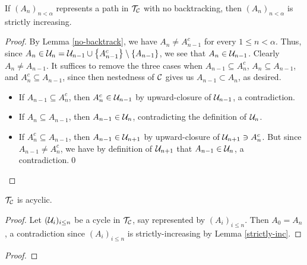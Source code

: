 \documentclass{amsart}
\begin{document}
    \begin{lemma}\label{strictly-inc}
        If $(A_n)_{n<\alpha}$ represents a path in $\mathcal{T}_{\mathcal{C}}$ with no backtracking, then $(A_n)_{n<\alpha}$ is strictly increasing.
    \end{lemma}
    \begin{proof}
        By Lemma \ref{no-backtrack}, we have $A_n\neq A_{n-1}^c$ for every $1\leq n<\alpha$. Thus, since $A_n\in\mathcal{U}_n=\mathcal{U}_{n-1}\cup\left\{A_{n-1}^c\right\}\setminus\left\{A_{n-1}\right\}$, we see that $A_n\in\mathcal{U}_{n-1}$. Clearly $A_n\neq A_{n-1}$. It suffices to remove the three cases when $A_{n-1}\subseteq A_n^c$, $A_n\subseteq A_{n-1}$, and $A_n^c\subseteq A_{n-1}$, since then nestedness of $\mathcal{C}$ gives us $A_{n-1}\subset A_n$, as desired.
        \begin{itemize}
            \item If $A_{n-1}\subseteq A_n^c$, then $A_n^c\in\mathcal{U}_{n-1}$ by upward-closure of $\mathcal{U}_{n-1}$, a contradiction.
            \item If $A_n\subseteq A_{n-1}$, then $A_{n-1}\in\mathcal{U}_n$, contradicting the definition of $\mathcal{U}_n$.
            \item If $A_n^c\subseteq A_{n-1}$, then $A_{n-1}\in\mathcal{U}_{n+1}$ by upward-closure of $\mathcal{U}_{n+1}\ni A_n^c$. But since $A_{n-1}\neq A_n^c$, we have by definition of $\mathcal{U}_{n+1}$ that $A_{n-1}\in\mathcal{U}_n$, a contradiction.\qed
        \end{itemize}
    \end{proof}

    \begin{proposition}\label{acyclic}
        $\mathcal{T}_{\mathcal{C}}$ is acyclic.
    \end{proposition}
    \begin{proof}
        Let $(\mathcal{U}_i)_{i\leq n}$ be a cycle in $\mathcal{T}_{\mathcal{C}}$, say represented by $(A_i)_{i\leq n}$. Then $A_0=A_n$, a contradiction since $(A_i)_{i\leq n}$ is strictly-increasing by Lemma \ref{strictly-inc}.
    \end{proof}

    \begin{proposition}\label{tree}
        
    \end{proposition}
    \begin{proof}
        
    \end{proof}
\end{document}
